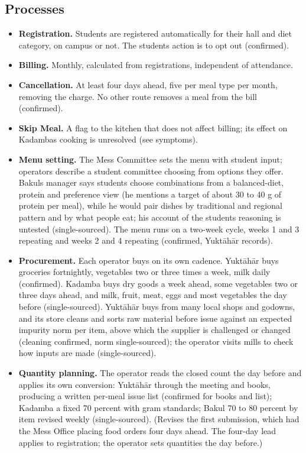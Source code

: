 \documentclass[
  10pt,
  table]{article}
\providecommand{\tightlist}{%
  \setlength{\itemsep}{0pt}\setlength{\parskip}{0pt}}
\renewcommand{\tightlist}{\setlength{\itemsep}{1.5pt}\setlength{\parskip}{0pt}}
\begin{document}
\subsection{Processes}\label{processes}

\begin{itemize}
\tightlist
\item
  \textbf{Registration.} Students are registered automatically for their hall and diet category, on campus or not. The student\textquotesingle s action is to opt out (confirmed).
\item
  \textbf{Billing.} Monthly, calculated from registrations, independent of attendance.
\item
  \textbf{Cancellation.} At least four days ahead, five per meal type per month, removing the charge. No other route removes a meal from the bill (confirmed).
\item
  \textbf{Skip Meal.} A flag to the kitchen that does not affect billing; its effect on Kadamba\textquotesingle s cooking is unresolved (see symptoms).
\item
  \textbf{Menu setting.} The Mess Committee sets the menu with student input; operators describe a student committee choosing from options they offer. Bakul\textquotesingle s manager says students choose combinations from a balanced-diet, protein and preference view (he mentions a target of about 30 to 40 g of protein per meal), while he would pair dishes by traditional and regional pattern and by what people eat; his account of the students\textquotesingle{} reasoning is untested (single-sourced). The menu runs on a two-week cycle, weeks 1 and 3 repeating and weeks 2 and 4 repeating (confirmed, Yuktāhār records).
\item
  \textbf{Procurement.} Each operator buys on its own cadence. Yuktāhār buys groceries fortnightly, vegetables two or three times a week, milk daily (confirmed). Kadamba buys dry goods a week ahead, some vegetables two or three days ahead, and milk, fruit, meat, eggs and most vegetables the day before (single-sourced). Yuktāhār buys from many local shops and godowns, and its store cleans and sorts raw material before issue against an expected impurity norm per item, above which the supplier is challenged or changed (cleaning confirmed, norm single-sourced); the operator visits mills to check how inputs are made (single-sourced).
\item
  \textbf{Quantity planning.} The operator reads the closed count the day before and applies its own conversion: Yuktāhār through the meeting and books, producing a written per-meal issue list (confirmed for books and list); Kadamba a fixed 70 percent with gram standards; Bakul 70 to 80 percent by item revised weekly (single-sourced). (Revises the first submission, which had the Mess Office placing food orders four days ahead. The four-day lead applies to registration; the operator sets quantities the day before.)

\end{itemize}
\end{document}
